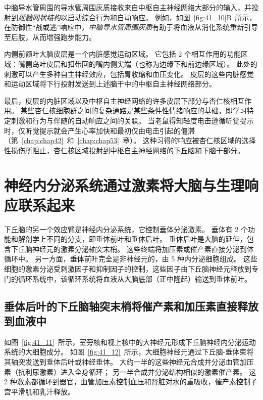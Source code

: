 中脑导水管周围的导水管周围灰质接收来自中枢自主神经网络大部分的输入，并投射到\textit{延髓网状结构}以启动综合行为和自动响应。
例如，如图~\ref{fig:41_10}B~所示，在防御性“战或逃”响应中，\textit{中脑导水管周围灰质}有助于将血液从消化系统重新引导至后肢，从而增强跑步能力。


内侧前额叶大脑皮层是一个内脏感觉运动区域。
它包括 2 个相互作用的功能区域：嘴侧岛叶皮层和扣带回的嘴内侧尖端（也称为边缘下和前边缘区域）。
此处的刺激可以产生多种自主神经效应，包括胃收缩和血压变化。
皮层的这些内脏感觉和运动区域将下行投射发送到上述脑干中的中枢自主神经网络部分。


最后，皮层的内脏区域以及中枢自主神经网络的许多皮层下部分与杏仁核相互作用。
某些杏仁核细胞群之间的复杂通路是某些条件性情绪响应的基础，即学习特定刺激和行为与伴随的自动响应之间的关联。
当老鼠得知轻度电击遵循听觉提示时，仅听觉提示就会产生心率加快和最初仅由电击引起的僵滞（第~\ref{chap:chap42}~和~\ref{chap:chap53}~章）。
这种习得的响应被杏仁核区域的选择性损伤所阻止，杏仁核区域投射到中枢自主神经网络的下丘脑和下脑干部分。



\section{神经内分泌系统通过激素将大脑与生理响应联系起来}

下丘脑的另一个效应臂是神经内分泌系统，它控制垂体分泌激素。
垂体有 2 个功能和解剖学上不同的分支，即垂体前叶和垂体后叶。
垂体后叶是大脑的延伸，包含下丘脑神经元的激素分泌轴突末梢。
这些终端将加压素或催产素直接分泌到体循环中。
另一方面，垂体前叶完全是非神经元的，由 5 种内分泌细胞组成。
这些细胞的激素分泌受刺激因子和抑制因子的控制，这些因子由下丘脑神经元释放到专门的循环系统中，该循环系统将血液从大脑底部（正中隆起）输送到垂体前叶。



\subsection{垂体后叶的下丘脑轴突末梢将催产素和加压素直接释放到血液中}

如图~\ref{fig:41_11}~所示，室旁核和视上核中的大神经元形成下丘脑神经内分泌运动系统的大细胞成分。
如图~\ref{fig:41_12}~所示，大细胞神经元通过下丘脑-垂体束将其轴突发送到垂体后叶或神经垂体。
大约一半的这些神经元合成并分泌血管加压素（抗利尿激素）进入全身循环；
另一半合成并分泌结构相似的激素催产素。
这 2 种激素都循环到器官，血管加压素控制血压和肾脏对水的重吸收，催产素控制子宫平滑肌和乳汁释放。


